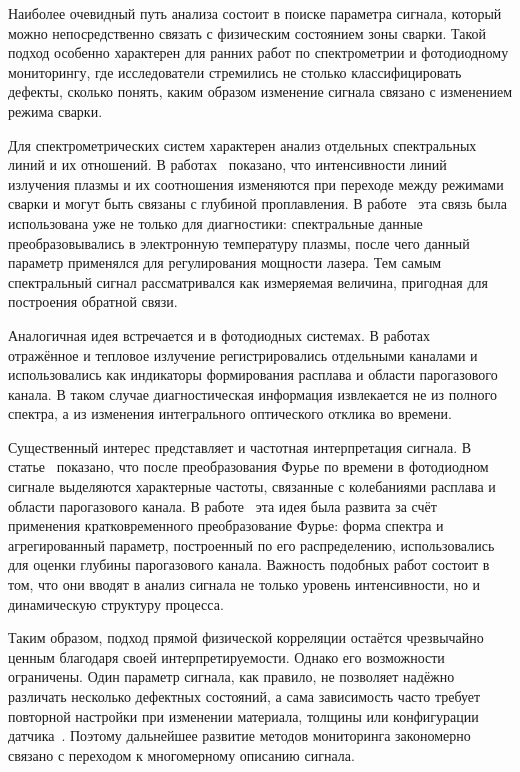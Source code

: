 Наиболее очевидный путь анализа состоит в поиске параметра сигнала, который можно непосредственно связать с физическим состоянием зоны сварки. Такой подход особенно характерен для ранних работ по спектрометрии и фотодиодному мониторингу, где исследователи стремились не столько классифицировать дефекты, сколько понять, каким образом изменение сигнала связано с изменением режима сварки.

Для спектрометрических систем характерен анализ отдельных спектральных линий и их отношений. В работах~\cite{bruncko2003monitoring,sebestova2012non,konuk2011closed,connolly2000optical} показано, что интенсивности линий излучения плазмы и их соотношения изменяются при переходе между режимами сварки и могут быть связаны с глубиной проплавления. В работе~\cite{konuk2011closed} эта связь была использована уже не только для диагностики: спектральные данные преобразовывались в электронную температуру плазмы, после чего данный параметр применялся для регулирования мощности лазера. Тем самым спектральный сигнал рассматривался как измеряемая величина, пригодная для построения обратной связи.

Аналогичная идея встречается и в фотодиодных системах. В работах~\cite{kawahito2004process,kawahito2009process} отражённое и тепловое излучение регистрировались отдельными каналами и использовались как индикаторы формирования расплава и области парогазового канала. В таком случае диагностическая информация извлекается не из полного спектра, а из изменения интегрального оптического отклика во времени.

Существенный интерес представляет и частотная интерпретация сигнала. В статье~\cite{geiger2008high} показано, что после преобразования Фурье по времени в фотодиодном сигнале выделяются характерные частоты, связанные с колебаниями расплава и области парогазового канала. В работе~\cite{mrvna2013correlation} эта идея была развита за счёт применения кратковременного преобразование Фурье: форма спектра и агрегированный параметр, построенный по его распределению, использовались для оценки глубины парогазового канала. Важность подобных работ состоит в том, что они вводят в анализ сигнала не только уровень интенсивности, но и динамическую структуру процесса.


Таким образом, подход прямой физической корреляции остаётся чрезвычайно ценным благодаря своей интерпретируемости. Однако его возможности ограничены. Один параметр сигнала, как правило, не позволяет надёжно различать несколько дефектных состояний, а сама зависимость часто требует повторной настройки при изменении материала, толщины или конфигурации датчика~\cite{wu2022progress,huang2025laser}. Поэтому дальнейшее развитие методов мониторинга закономерно связано с переходом к многомерному описанию сигнала.

